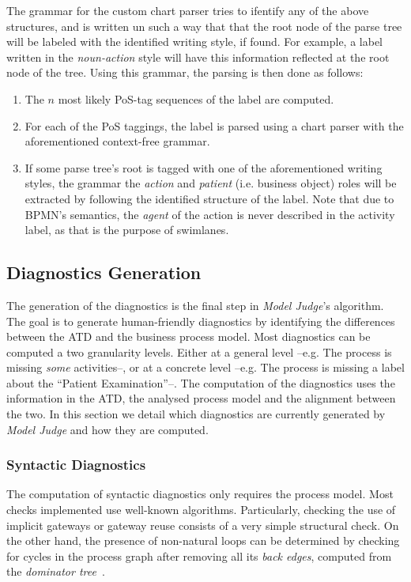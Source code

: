 The grammar for the custom chart parser tries to ifentify any of the above
structures, and is written un such a way that that the root node of the parse
tree will be labeled with the identified writing style, if found. For example, a
label written in the \emph{noun-action} style will have this information
reflected at the root node of the tree. Using this grammar, the parsing is then
done as follows:

\begin{enumerate}
  \item {The $n$ most likely PoS-tag sequences of the label are computed.}
  \item {For each of the PoS taggings, the label is parsed using a chart
        parser with the aforementioned context-free grammar.}
  \item {If some parse tree's root is tagged with one of the aforementioned
      writing styles, the grammar the \emph{action} and \emph{patient} (i.e.
      business object) roles will be extracted by following the identified
      structure of the label. Note that due to BPMN's semantics, the
      \emph{agent} of the action is never described in the activity label, as
      that is the purpose of swimlanes.}
    
    
\end{enumerate}


\subsection{Diagnostics Generation}
\label{sec:diagnostics_generation}

The generation of the diagnostics is the final step in \emph{Model Judge}'s
algorithm. The goal is to generate human-friendly diagnostics by identifying the
differences between the ATD and the business process model. Most diagnostics can
be computed a two granularity levels. Either at a general level --e.g. The
process is missing \emph{some} activities--, or at a concrete level --e.g. The
process is missing a label about the ``Patient Examination''--. The computation
of the diagnostics uses the information in the ATD, the analysed process model
and the alignment between the two. In this section we detail which diagnostics
are currently generated by \emph{Model Judge} and how they are computed.

\subsubsection*{Syntactic Diagnostics}
The computation of syntactic diagnostics only requires the
process model. Most checks implemented use well-known algorithms. Particularly,
checking the use of implicit gateways or gateway reuse consists of a very simple
structural check. On the other hand, the presence of non-natural loops can be
determined by checking for cycles in the process graph after removing all its
{\em back edges}, computed from the {\em dominator tree}~\cite{LengauerT79}.

